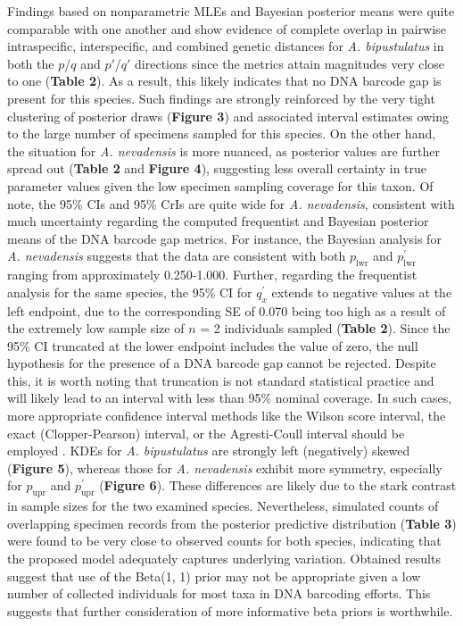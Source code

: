 \documentclass[12pt]{article}
\begin{document}
Findings based on nonparametric MLEs and Bayesian posterior means were quite \\ comparable with one another and show evidence of complete overlap in pairwise intraspecific, interspecific, and combined genetic distances for \textit{A. bipustulatus} in both the $p$/$q$ and $p'$/$q'$ directions since the metrics attain magnitudes very close to one (\textbf{Table 2}). As a result, this likely indicates that no DNA barcode gap is present for this species. Such findings are strongly reinforced by the very tight clustering of posterior draws (\textbf{Figure 3}) and associated interval estimates owing to the large number of specimens sampled for this species. On the other hand, the situation for \textit{A. nevadensis} is more nuanced, as posterior values are further spread out (\textbf{Table 2} and \textbf{Figure 4}), suggesting less overall certainty in true parameter values given the low specimen sampling coverage for this taxon. Of note, the 95\% CIs and 95\% CrIs are quite wide for \textit{A. nevadensis}, consistent with much uncertainty regarding the computed frequentist and Bayesian posterior means of the DNA barcode gap metrics. For instance, the Bayesian analysis for \textit{A. nevadensis} suggests that the data are consistent with both $p_{\mathrm{lwr}}$ and $p^{'}_{\mathrm{lwr}}$ ranging from approximately 0.250-1.000. Further, regarding the frequentist analysis for the same species, the 95\% CI for $q^{'}_x$ extends to negative values at the left endpoint, due to the corresponding SE of 0.070 being too high as a result of the extremely low sample size of $n$ = 2 individuals sampled (\textbf{Table 2}). Since the 95\% CI truncated at the lower endpoint includes the value of zero, the null hypothesis for the presence of a DNA barcode gap cannot be rejected. Despite this, it is worth noting that truncation is not standard statistical practice and will likely lead to an interval with less than 95\% nominal coverage. In such cases, more appropriate confidence interval methods like the Wilson score interval, the exact (Clopper-Pearson) interval, or the Agresti-Coull interval should be employed \citep{newcombe1998confidence, agresti1998approximate}. KDEs for \textit{A. bipustulatus} are strongly left (negatively) skewed (\textbf{Figure 5}), whereas those for \textit{A. nevadensis} exhibit more symmetry, especially for $p_{\mathrm{upr}}$ and $p^{'}_{\mathrm{upr}}$ (\textbf{Figure 6}). These differences are likely due to the stark contrast in sample sizes for the two examined species. Nevertheless, simulated counts of overlapping specimen records from the posterior predictive distribution (\textbf{Table 3}) were found to be very close to observed counts for both species, indicating that the proposed model adequately captures underlying variation. Obtained results suggest that use of the Beta(1, 1) prior may not be appropriate given a low number of collected individuals for most taxa in DNA barcoding efforts. This suggests that further consideration of more informative beta priors is worthwhile. 
\end{document}
